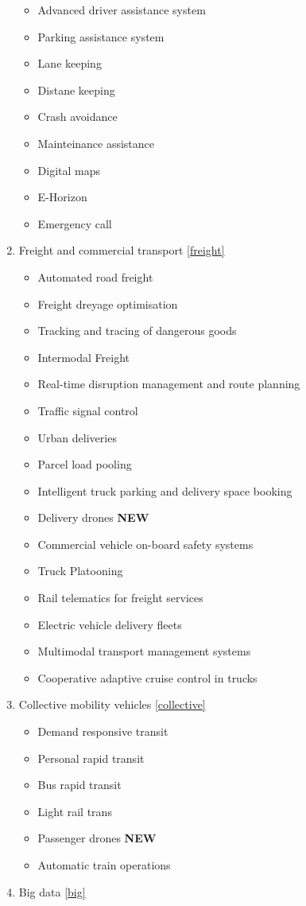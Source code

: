 \documentclass[
]{book}
\providecommand{\tightlist}{%
  \setlength{\itemsep}{0pt}\setlength{\parskip}{0pt}}
\begin{document}
\begin{enumerate}
  \begin{itemize}
  \tightlist
  \item
    Advanced driver assistance system
  \item
    Parking assistance system
  \item
    Lane keeping
  \item
    Distane keeping
  \item
    Crash avoidance
  \item
    Mainteinance assistance
  \item
    Digital maps
  \item
    E-Horizon
  \item
    Emergency call
  \end{itemize}
\item
  Freight and commercial transport \ref{freight}

  \begin{itemize}
  \tightlist
  \item
    Automated road freight
  \item
    Freight dreyage optimisation
  \item
    Tracking and tracing of dangerous goods
  \item
    Intermodal Freight
  \item
    Real-time disruption management and route planning
  \item
    Traffic signal control
  \item
    Urban deliveries
  \item
    Parcel load pooling
  \item
    Intelligent truck parking and delivery space booking
  \item
    Delivery drones \textbf{NEW}
  \item
    Commercial vehicle on-board safety systems
  \item
    Truck Platooning
  \item
    Rail telematics for freight services
  \item
    Electric vehicle delivery fleets
  \item
    Multimodal transport management systems
  \item
    Cooperative adaptive cruise control in trucks
  \end{itemize}
\item
  Collective mobility vehicles \ref{collective}

  \begin{itemize}
  \tightlist
  \item
    Demand responsive transit
  \item
    Personal rapid transit
  \item
    Bus rapid transit
  \item
    Light rail trans
  \item
    Passenger drones \textbf{NEW}
  \item
    Automatic train operations
  \end{itemize}
\item
  Big data \ref{big}


\end{enumerate}
\end{document}

